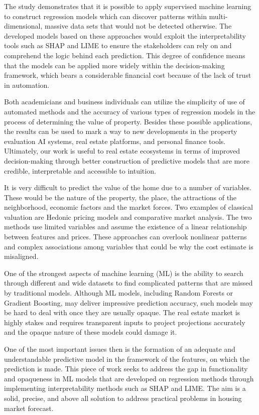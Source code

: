 \documentclass[12pt, a4paper, oneside]{book}
\begin{document}
The study demonstrates that it is possible to apply supervised machine learning to construct regression models which can discover patterns within multi-dimensional, massive data sets that would not be detected otherwise. The developed models based on these approaches would exploit the interpretability tools such as SHAP and LIME to ensure the stakeholders can rely on and comprehend the logic behind each prediction. This degree of confidence means that the models can be applied more widely within the decision-making framework, which bears a considerable financial cost because of the lack of trust in automation.


Both academicians and business individuals can utilize the simplicity of use of automated methods and the accuracy of various types of regression models in the process of determining the value of property. Besides these possible applications, the results can be used to mark a way to new developments in the property evaluation AI systems, real estate platforms, and personal finance tools. Ultimately, our work is useful to real estate ecosystems in terms of improved decision-making through better construction of predictive models that are more credible, interpretable and accessible to intuition.


It is very difficult to predict the value of the home due to a number of variables. These would be the nature of the property, the place, the attractions of the neighborhood, economic factors and the market forces. Two examples of classical valuation are Hedonic pricing models and comparative market analysis. The two methods use limited variables and assume the existence of a linear relationship between features and prices. These approaches can overlook nonlinear patterns and complex associations among variables that could be why the cost estimate is misaligned.


One of the strongest aspects of machine learning (ML) is the ability to search through different and wide datasets to find complicated patterns that are missed by traditional models. Although ML models, including Random Forests or Gradient Boosting, may deliver impressive prediction accuracy, such models may be hard to deal with once they are usually opaque. The real estate market is highly stakes and requires transparent inputs to project projections accurately and the opaque nature of these models could damage it.


One of the most important issues then is the formation of an adequate and understandable predictive model in the framework of the features, on which the prediction is made. This piece of work seeks to address the gap in functionality and opaqueness in ML models that are developed on regression methods through implementing interpretability methods such as SHAP and LIME. The aim is a solid, precise, and above all solution to address practical problems in housing market forecast.
\end{document}
